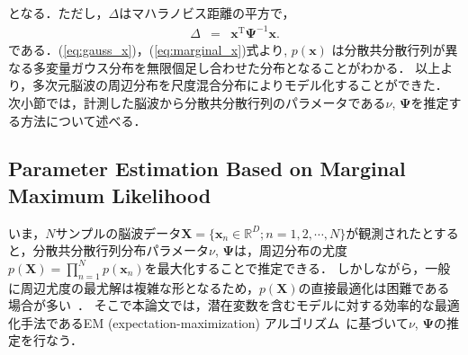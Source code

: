 \documentclass[journal]{IEEEtran}
\begin{document}
%
となる．ただし，$\Delta$はマハラノビス距離の平方で，
%
\begin{eqnarray}
	\Delta &=& \mathbf{x}^\mathrm{T}{\bm \Psi}^{-1}\mathbf{x}.
\end{eqnarray}
%
である．(\ref{eq:gauss_x})，(\ref{eq:marginal_x})式より, $p(\mathbf{x})$ は分散共分散行列が異なる多変量ガウス分布を無限個足し合わせた分布となることがわかる．
以上より，多次元脳波の周辺分布を尺度混合分布によりモデル化することができた．
次小節では，計測した脳波から分散共分散行列のパラメータである$\nu$, $\mathbf{\Psi}$を推定する方法について述べる． %

\subsection{Parameter Estimation Based on Marginal Maximum Likelihood}
いま，$N$サンプルの脳波データ$\mathbf{X} = \{\mathbf{x}_n \in \mathbb{R}^{D}; n=1,2,\cdots,N \}$が観測されたとすると，分散共分散行列分布パラメータ$\nu$, $\bm \Psi$は，周辺分布の尤度$p(\mathbf{X}) = \prod_{n=1}^{N} p(\mathbf{x}_n)$を最大化することで推定できる．
しかしながら，一般に周辺尤度の最尤解は複雑な形となるため，$p(\mathbf{X})$の直接最適化は困難である場合が多い~\cite{t2006}．
そこで本論文では，潜在変数を含むモデルに対する効率的な最適化手法であるEM (expectation-maximization) アルゴリズム~\cite{Models1998}に基づいて$\nu$, $\bm \Psi$の推定を行なう．
\end{document}
